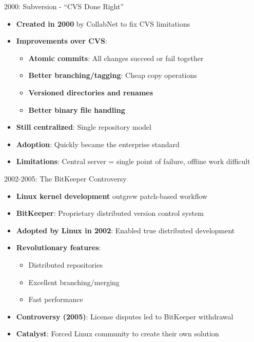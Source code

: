 \documentclass{beamer}
\begin{document}
\begin{frame}[t]{2000: Subversion - ``CVS Done Right''}
\begin{itemize}
    \item \textbf{Created in 2000} by CollabNet to fix CVS limitations
    \item \textbf{Improvements over CVS}:
        \begin{itemize}
            \item \textbf{Atomic commits}: All changes succeed or fail together
            \item \textbf{Better branching/tagging}: Cheap copy operations
            \item \textbf{Versioned directories and renames}
            \item \textbf{Better binary file handling}
        \end{itemize}
    \item \textbf{Still centralized}: Single repository model
    \item \textbf{Adoption}: Quickly became the enterprise standard
    \item \textbf{Limitations}: Central server = single point of failure, offline work difficult
\end{itemize}
\end{frame}


\begin{frame}[t]{2002-2005: The BitKeeper Controversy}
        \begin{itemize}
            \item \textbf{Linux kernel development} outgrew patch-based workflow
            \item \textbf{BitKeeper}: Proprietary distributed version control system
            \item \textbf{Adopted by Linux in 2002}: Enabled true distributed development
            \item \textbf{Revolutionary features}:
                \begin{itemize}
                    \item Distributed repositories
                    \item Excellent branching/merging
                    \item Fast performance
                \end{itemize}
            \item \textbf{Controversy (2005)}: License disputes led to BitKeeper withdrawal
            \item \textbf{Catalyst}: Forced Linux community to create their own solution
        \end{itemize}
\end{frame}
\end{document}
